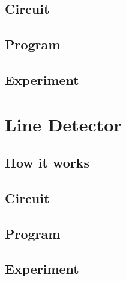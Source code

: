 \documentclass[12pt]{article}
\begin{document}
\subsection{Circuit}

\subsection{Program}

\subsection{Experiment}







\section{Line Detector}

\subsection{How it works}

\subsection{Circuit}

\subsection{Program}

\subsection{Experiment}




\newpage
%
%

\printbibliography


	

\end{document}
